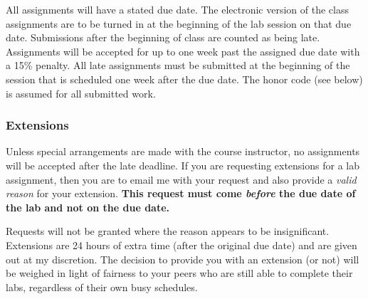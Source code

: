 \documentclass[11pt]{article} %
\begin{document}
All assignments will have a stated due date. \color{red} The electronic version of the class assignments are to be turned in at the beginning of the lab session on that due date. Submissions after the beginning of class are counted as being late. \color{black}  Assignments will be accepted for up to one week past the assigned due date with a 15\% penalty. All late assignments must be submitted at the beginning of the session that is scheduled one week after the due date. The honor code (see below) is assumed for all submitted work.

  
\subsubsection*{\textbf{Extensions}}
Unless special arrangements are made with the course instructor, no assignments will be accepted after the late deadline. If you are requesting extensions for a lab assignment, then you are to email me with your request and also provide a \emph{valid reason} for your extension. \textbf{This request must come \emph{before} the due date of the lab and not on the due date.}

Requests will not be granted where the reason appears to be insignificant. Extensions are 24 hours of extra time (after the original due date) and are given out at my discretion. The decision to provide you with an extension (or not) will be weighed in light of fairness to your peers who are still able to complete their labs, regardless of their own busy schedules.

\end{document}
